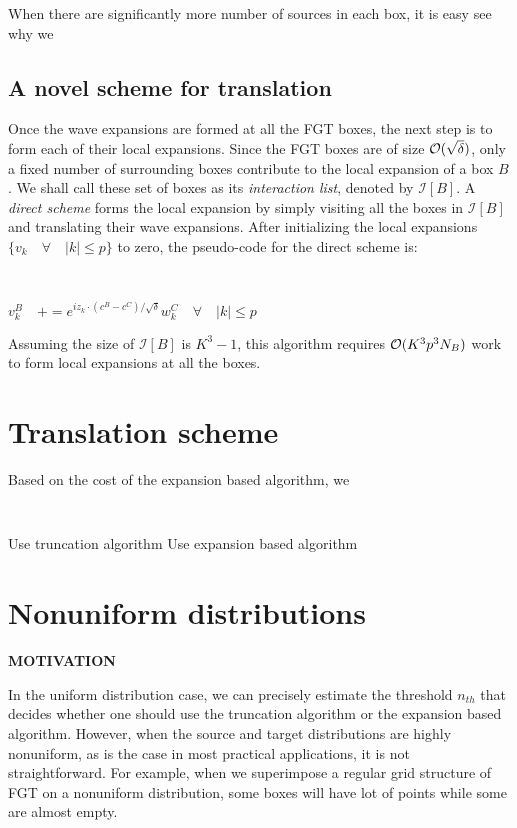 \documentclass[conference]{IEEEtran}
\begin{document}
When there are significantly more number of sources in each box, it is easy see why we


%

\subsection{A novel scheme for translation} 
Once the wave expansions are formed at all the FGT boxes, the next step is to form each of their local expansions. Since the FGT boxes are of size $\mathcal{O}(\sqrt{\delta})$, only a fixed number of surrounding boxes contribute to the local expansion of a box $B$. We shall call these set of boxes as its {\em interaction list}, denoted by $\mathcal{I} [B]$. A {\em direct scheme} forms the local expansion by simply visiting all the boxes in $\mathcal{I}[B]$ and translating their wave expansions. After initializing the local expansions $\{ v_k \quad \forall \quad |k| \leq p \}$ to zero, the pseudo-code for the direct scheme is:
%
{\tt
\begin{algorithmic}
           \STATE $ v_k^B \quad += e^{i z_k \cdot(c^B - c^C)/\sqrt{\delta}} w_k^C \quad \forall \quad |k| \leq p$
       \ENDFOR
\STATE
\end{algorithmic}
}
%
Assuming the size of $\mathcal{I}[B]$ is $K^3 - 1$, this algorithm requires $\mathcal{O}(K^3 p^3 N_B)$ work to form local expansions at all the boxes. 
%
\section{Translation scheme} \label{sc:sweep}


Based on the cost of the expansion based algorithm, we 

{\tt
\begin{algorithmic}
\STATE
     \STATE Use truncation algorithm 
  \ELSE 
     \STATE Use expansion based algorithm
  \ENDIF
\STATE
\end{algorithmic}
}



\section{Nonuniform distributions} 
\label{sc:nonuniform}

{\bf MOTIVATION}

In the uniform distribution case, we can precisely estimate the threshold $n_{th}$ that decides whether one should use the truncation algorithm or the expansion based algorithm. However, when the source and target distributions are highly nonuniform, as is the case in most practical applications, it is not straightforward. For example, when we superimpose a regular grid structure of FGT on a nonuniform distribution, some boxes will have lot of points while some are almost empty. 
\end{document}
